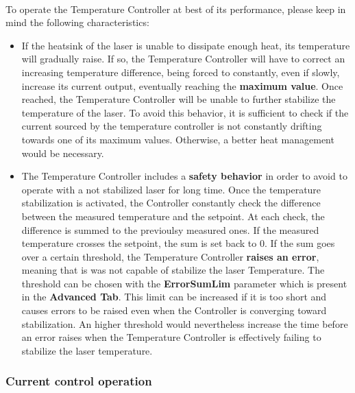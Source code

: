 \paragraph{}To operate the Temperature Controller at best of its performance, please keep in mind the following characteristics:
\begin{itemize}
    \item If the heatsink of the laser is unable to dissipate enough heat, its temperature will gradually raise. If so, the Temperature Controller will have to correct an increasing temperature difference, being forced to constantly, even if slowly, increase its current output, eventually reaching the \textbf{maximum value}. Once reached, the Temperature Controller will be unable to further stabilize the temperature of the laser.
    \newline To avoid this behavior, it is sufficient to check if the current sourced by the temperature controller is not constantly drifting towards one of its maximum values. Otherwise, a better heat management would be necessary.
    \item The Temperature Controller includes a \textbf{safety behavior} in order to avoid to operate with a not stabilized laser for long time. Once the temperature stabilization is activated, the Controller constantly check the difference between the measured temperature and the setpoint. At each check, the difference is summed to the previoulsy measured ones. If the measured temperature crosses the setpoint, the sum is set back to 0.
    \newline If the sum goes over a certain threshold, the Temperature Controller \textbf{raises an error}, meaning that is was not capable of stabilize the laser Temperature. The threshold can be chosen with the \textbf{ErrorSumLim} parameter which is present in the \textbf{Advanced Tab}. This limit can be increased if it is too short and causes errors to be raised even when the Controller is converging toward stabilization. An higher threshold would nevertheless increase the time before an error raises when the Temperature Controller is effectively failing to stabilize the laser temperature.
\end{itemize}





\subsubsection{Current control operation}   \label{CM_operation_chapter}
